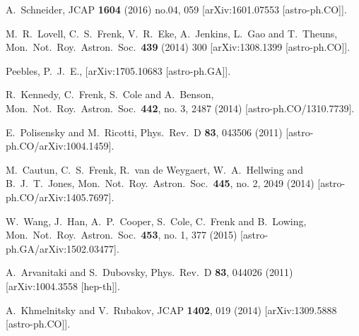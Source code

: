 \documentclass[11pt,nofootinbib]{article}
\numberwithin{equation}{section}
\begin{document}
\begin{thebibliography}{99}
  A.~Schneider,
  JCAP {\bf 1604} (2016) no.04,  059
  [arXiv:1601.07553 [astro-ph.CO]].
  
  M.~R.~Lovell, C.~S.~Frenk, V.~R.~Eke, A.~Jenkins, L.~Gao and T.~Theuns,
  Mon.\ Not.\ Roy.\ Astron.\ Soc.\  {\bf 439} (2014) 300
  [arXiv:1308.1399 [astro-ph.CO]].
  
  Peebles, P.~J.~E., 
  [arXiv:1705.10683 [astro-ph.GA]].

  R.~Kennedy, C.~Frenk, S.~Cole and A.~Benson,
  Mon.\ Not.\ Roy.\ Astron.\ Soc.\  {\bf 442}, no. 3, 2487 (2014)
  [astro-ph.CO/1310.7739].
	
  E.~Polisensky and M.~Ricotti,
  Phys.\ Rev.\ D {\bf 83}, 043506 (2011)
  [astro-ph.CO/arXiv:1004.1459].

  M.~Cautun, C.~S.~Frenk, R.~van de Weygaert, W.~A.~Hellwing and B.~J.~T.~Jones,
  Mon.\ Not.\ Roy.\ Astron.\ Soc.\  {\bf 445}, no. 2, 2049 (2014)
  [astro-ph.CO/arXiv:1405.7697].  
	
  W.~Wang, J.~Han, A.~P.~Cooper, S.~Cole, C.~Frenk and B.~Lowing,
  Mon.\ Not.\ Roy.\ Astron.\ Soc.\  {\bf 453}, no. 1, 377 (2015)
  [astro-ph.GA/arXiv:1502.03477].  

  A.~Arvanitaki and S.~Dubovsky,
  Phys.\ Rev.\ D {\bf 83}, 044026 (2011)
  [arXiv:1004.3558 [hep-th]].

  A.~Khmelnitsky and V.~Rubakov,
  JCAP {\bf 1402}, 019 (2014)
  [arXiv:1309.5888 [astro-ph.CO]].


\end{thebibliography}
\end{document}

